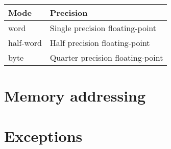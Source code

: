 \begin{tabular}{|l|l|}
  \hline
  \textbf{Mode} & \textbf{Precision} \\
  \hline
  word & Single precision floating-point \\
  \hline
  half-word & Half precision floating-point \\
  \hline
  byte & Quarter precision floating-point \\
  \hline
\end{tabular}

\section{Memory addressing}

\tbd

\section{Exceptions}

\tbd
